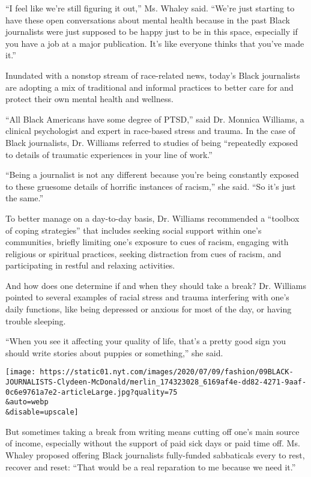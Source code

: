 ``I feel like we're still figuring it out,'' Ms. Whaley said. ``We're
just starting to have these open conversations about mental health
because in the past Black journalists were just supposed to be happy
just to be in this space, especially if you have a job at a major
publication. It's like everyone thinks that you've made it.''

Inundated with a nonstop stream of race-related news, today's Black
journalists are adopting a mix of traditional and informal practices to
better care for and protect their own mental health and wellness.

``All Black Americans have some degree of PTSD,'' said Dr. Monnica
Williams, a clinical psychologist and expert in race-based stress and
trauma. In the case of Black journalists, Dr. Williams referred to
studies of being ``repeatedly exposed to details of traumatic
experiences in your line of work.''

``Being a journalist is not any different because you're being
constantly exposed to these gruesome details of horrific instances of
racism,'' she said. ``So it's just the same.''

To better manage on a day-to-day basis, Dr. Williams recommended a
``toolbox of coping strategies'' that includes seeking social support
within one's communities, briefly limiting one's exposure to cues of
racism, engaging with religious or spiritual practices, seeking
distraction from cues of racism, and participating in restful and
relaxing activities.

And how does one determine if and when they should take a break? Dr.
Williams pointed to several examples of racial stress and trauma
interfering with one's daily functions, like being depressed or anxious
for most of the day, or having trouble sleeping.

``When you see it affecting your quality of life, that's a pretty good
sign you should write stories about puppies or something,'' she said.

\texttt{[image: https://static01.nyt.com/images/2020/07/09/fashion/09BLACK-JOURNALISTS-Clydeen-McDonald/merlin\_174323028\_6169af4e-dd82-4271-9aaf-0c6e9761a7e2-articleLarge.jpg?quality=75\\\&auto=webp\\\&disable=upscale]}

But sometimes taking a break from writing means cutting off one's main
source of income, especially without the support of paid sick days or
paid time off. Ms. Whaley proposed offering Black journalists
fully-funded sabbaticals every to rest, recover and reset: ``That would
be a real reparation to me because we need it.''

